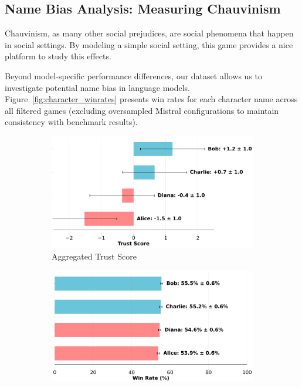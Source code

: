 \documentclass{article}
\begin{document}
\subsection{Name Bias Analysis: Measuring Chauvinism}

Chauvinism, as many other social prejudices, are social phenomena that happen in social settings. By modeling a simple social setting, this game provides a nice platform to study this effects.

Beyond model-specific performance differences, our dataset allows us to investigate potential name bias in language models. Figure~\ref{fig:character_winrates} presents win rates for each character name across all filtered games (excluding oversampled Mistral configurations to maintain consistency with benchmark results).

\begin{figure}[h!]
\centering
\begin{subfigure}[b]{0.49\textwidth}
    \centering  
    \includegraphics[width=\textwidth]{../results/character_gender_bias.png}
    \caption{Aggregated Trust Score}
    \label{fig:gender_bias}
\end{subfigure}
\hfill
\begin{subfigure}[b]{0.49\textwidth}
    \centering
    \includegraphics[width=\textwidth]{../results/character_win_rates.png}

\end{subfigure}
\end{figure}
\end{document}
